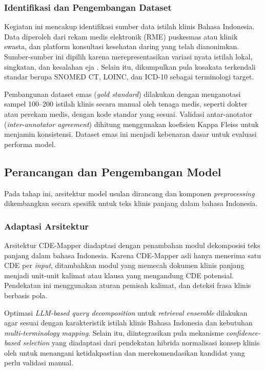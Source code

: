 \subsubsection{Identifikasi dan Pengembangan Dataset}

Kegiatan ini mencakup identifikasi sumber data istilah klinis Bahasa Indonesia. Data diperoleh dari rekam medis elektronik (RME) puskesmas atau klinik swasta, dan platform konsultasi kesehatan daring yang telah dianonimkan. Sumber-sumber ini dipilih karena merepresentasikan variasi nyata istilah lokal, singkatan, dan kesalahan eja \citep{purwitasari_comparison_2023,hossain_exploratory_2025}. Selain itu, dikumpulkan pula kosakata terkendali standar berupa SNOMED CT, LOINC, dan ICD-10 sebagai terminologi target.

Pembangunan dataset emas (\textit{gold standard}) dilakukan dengan menganotasi sampel 100--200 istilah klinis secara manual oleh tenaga medis, seperti dokter atau perekam medis, dengan kode standar yang sesuai. Validasi antar-anotator (\textit{inter-annotator agreement}) dihitung menggunakan koefisien Kappa Fleiss untuk menjamin konsistensi. Dataset emas ini menjadi kebenaran dasar untuk evaluasi performa model.

\subsection{Perancangan dan Pengembangan Model}

Pada tahap ini, arsitektur model usulan dirancang dan komponen \textit{preprocessing} dikembangkan secara spesifik untuk teks klinis panjang dalam bahasa Indonesia.

\subsubsection{Adaptasi Arsitektur}

Arsitektur CDE-Mapper diadaptasi dengan penambahan modul dekomposisi teks panjang dalam bahasa Indonesia. Karena CDE-Mapper asli hanya menerima satu CDE per \textit{input}, ditambahkan modul yang memecah dokumen klinis panjang menjadi unit-unit kalimat atau klausa yang mengandung CDE potensial. Pendekatan ini menggunakan aturan pemisah kalimat, dan deteksi frasa klinis berbasis pola.

Optimasi \textit{LLM-based query decomposition} untuk \textit{retrieval ensemble} dilakukan agar sesuai dengan karakteristik istilah klinis Bahasa Indonesia dan kebutuhan \textit{multi-terminology mapping}. Selain itu, diintegrasikan pula mekanisme \textit{confidence-based selection} yang diadaptasi dari pendekatan hibrida normalisasi konsep klinis oleh \citet{chen_clinical_2020} untuk menangani ketidakpastian dan merekomendasikan kandidat yang perlu validasi manual.

